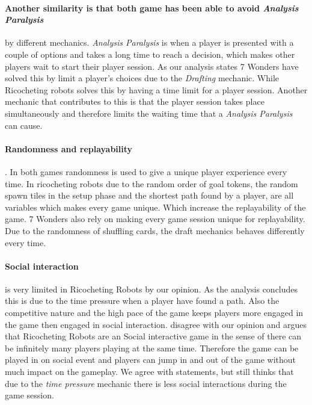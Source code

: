 \documentclass[a4paper]{article}
\begin{document}
  \paragraph{Another similarity is that both game has been able to avoid \textit{Analysis Paralysis}} by different mechanics.
  \textit{Analysis Paralysis} is when a player is presented with a couple of options and takes a long time to reach a decision, which makes other players wait to start their player session.
  As our analysis states 7 Wonders have solved this by limit a player's choices due to the \textit{Drafting} mechanic.
  While Ricocheting robots solves this by having a time limit for a player session.
  Another mechanic that contributes to this is that the player session takes place simultaneously and therefore limits the waiting time that a \textit{Analysis Paralysis} can cause.

  \paragraph{Randomness and replayability}.
  In both games randomness is used to give a unique player experience every time.
  In ricocheting robots due to the random order of goal tokens, the random spawn tiles in the setup phase and the shortest path found by a player, are all variables which makes every game unique. Which increase the replayability of the game. 7 Wonders also rely on making every game session unique for replayability. Due to the randomness of shuffling cards, the draft mechanics behaves differently every time.

  \paragraph{Social interaction} is very limited in Ricocheting Robots by our opinion.
  As the analysis concludes this is due to the time pressure when a player have found a path.
  Also the competitive nature and the high pace of the game keeps players more engaged in the game then engaged in social interaction.
   disagree with our opinion and argues that Ricocheting Robots are an Social interactive game in the sense of there can be infinitely many players playing at the same time.
  Therefore the game can be played in on social event and players can jump in and out of the game without much impact on the gameplay.
  We agree with \citeauthor{danbeckRR} statements, but still thinks that due to the \textit{time pressure} mechanic there is less social interactions during the game session.
\end{document}

